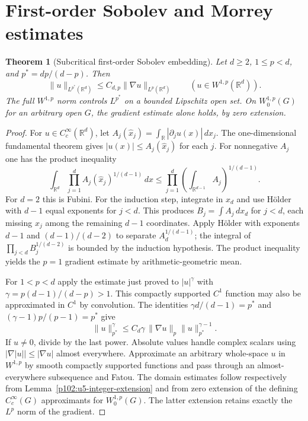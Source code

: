 \documentclass[11pt,oneside,openany]{book}
\newtheorem{theorem}{Theorem}[chapter]
\theoremstyle{definition}
\theoremstyle{remark}
\begin{document}
\section{First-order Sobolev and Morrey estimates}

\begin{theorem}[Subcritical first-order Sobolev embedding]
\label{p102:AN-11-C04-R02}
Let \(d\ge2\), \(1\le p<d\), and \(p^*=dp/(d-p)\). Then
\[
 \|u\|_{L^{p^*}(\mathbb R^d)}\le C_{d,p}\|\nabla u\|_{L^p(\mathbb R^d)}
 \qquad (u\in W^{1,p}(\mathbb R^d)).
\]
The full \(W^{1,p}\) norm controls \(L^{p^*}\) on a bounded
Lipschitz open set. On \(W_0^{1,p}(G)\) for an arbitrary open \(G\),
the gradient estimate alone holds, by zero extension.
\end{theorem}
\begin{proof}
For \(u\in C_c^\infty(\mathbb R^d)\), let
\(A_j(\widehat x_j)=\int_{\mathbb R}|\partial_j u(x)|\,dx_j\).
The one-dimensional fundamental theorem gives \(|u(x)|\le A_j(\widehat
x_j)\) for each \(j\). For nonnegative \(A_j\) one has the product inequality
\[
 \int_{\mathbb R^d}\prod_{j=1}^d A_j(\widehat x_j)^{1/(d-1)}\,dx
 \le \prod_{j=1}^d\left(\int_{\mathbb R^{d-1}} A_j\right)^{1/(d-1)} .
\]
For \(d=2\) this is Fubini. For the induction step, integrate in \(x_d\)
and use H\"older with \(d-1\) equal exponents for \(j<d\). This produces
\(B_j=\int A_j\,dx_d\) for \(j<d\), each missing \(x_j\) among the
remaining \(d-1\) coordinates. Apply H\"older with exponents \(d-1\)
and \((d-1)/(d-2)\) to separate \(A_d^{1/(d-1)}\); the integral
of \(\prod_{j<d}B_j^{1/(d-2)}\) is bounded by the induction hypothesis.
The product inequality yields the \(p=1\) gradient estimate by
arithmetic-geometric mean.

For \(1<p<d\) apply the estimate just proved to \(|u|^\gamma\) with
\(\gamma=p(d-1)/(d-p)>1\). This compactly supported \(C^1\)
function may also be approximated in \(C^1\) by convolution.
The identities
\(\gamma d/(d-1)=p^*\) and \((\gamma-1)p/(p-1)=p^*\) give
\[
 \|u\|_{p^*}^{\gamma}\le C_d\gamma\,
 \|\nabla u\|_p \|u\|_{p^*}^{\gamma-1}.
\]
If \(u\ne0\), divide by the last power. Absolute values handle complex
scalars using \(|\nabla |u||\le|\nabla u|\) almost everywhere.
Approximate an arbitrary whole-space \(u\) in \(W^{1,p}\) by smooth
compactly supported functions and pass through an almost-everywhere
subsequence and Fatou. The domain estimates follow respectively from
Lemma~\ref{p102:u5-integer-extension} and from zero extension of the
defining \(C_c^\infty(G)\) approximants for \(W_0^{1,p}(G)\). The latter
extension retains exactly the \(L^p\) norm of the gradient.
\end{proof}
\end{document}
